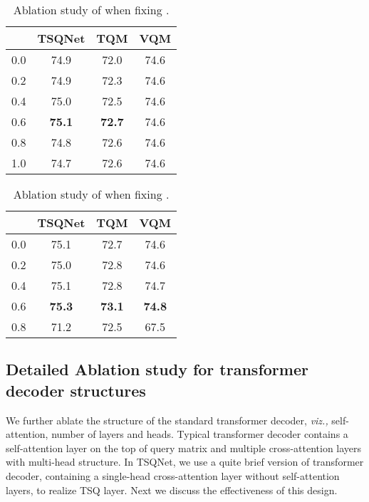 \documentclass[runningheads]{llncs}
\begin{document}
\begin{table}
\begin{minipage}[t]{0.47\linewidth}
\begin{center}
\caption{Ablation study of  when fixing .}
\label{table:alpha}
\setlength{\tabcolsep}{3.0pt}
\begin{tabular}{cccc}
\toprule
 & TSQNet& TQM  & VQM\\
\midrule
0.0 &  74.9 & 72.0 &74.6 \\
0.2 &  74.9 & 72.3 & 74.6\\
0.4 &  75.0 & 72.5 & 74.6\\
0.6 &  \textbf{75.1} & \textbf{72.7} & 74.6\\
0.8 &  74.8    & 72.6 & 74.6 \\
1.0 &  74.7   & 72.6 & 74.6 \\
\bottomrule
\end{tabular}
\end{center}
\end{minipage}
\hfill
\begin{minipage}[t]{0.47\linewidth}
\begin{center}
\caption{Ablation study of  when fixing .}\label{table3:beta}
\setlength{\tabcolsep}{3.0pt}
\renewcommand{\arraystretch}{1.18}
\begin{tabular}{cccc}
\toprule
 & TSQNet & TQM & VQM \\
\midrule
0.0 &  75.1 & 72.7 & 74.6 \\
0.2 &  75.0 & 72.8 & 74.6 \\
0.4 &  75.1  & 72.8 & 74.7\\
0.6 &  \textbf{75.3}  & \textbf{73.1} & \textbf{74.8}\\
0.8 &  71.2  & 72.5 & 67.5\\
\bottomrule
\end{tabular}
\end{center}
\end{minipage}
\end{table} 
\subsection{Detailed Ablation study for transformer decoder structures}
We further ablate the structure of the standard transformer decoder, \emph{viz.,} self-attention, number of layers and heads.  Typical transformer decoder contains a self-attention layer on the top of query matrix and multiple cross-attention layers with multi-head structure. In TSQNet, we use a quite brief version of transformer decoder, containing a single-head cross-attention layer without self-attention layers, to realize TSQ layer. Next we discuss the effectiveness of this design.  
\end{document}
